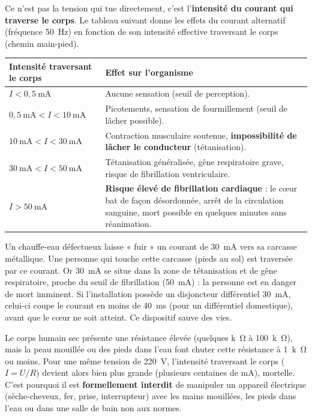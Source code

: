 \documentclass[11pt]{article}
\newcounter{popsec}
\newcounter{popsub}
\newcommand{\courssub}[1]{%
  \stepcounter{popsub}%
  \par\vspace{9pt}\noindent{\popxbold\fontsize{11.5}{13}\selectfont\color{popink}{\color{poporange}\thepopsec.\thepopsub}\hspace{6pt}#1}\par\nopagebreak\vspace{4pt}
}
\begin{document}
\courssub{Le danger du courant pour le corps humain}

Ce n'est pas la tension qui tue directement, c'est l'\textbf{intensité du courant qui traverse le corps}. Le tableau suivant donne les effets du courant alternatif (fréquence \SI{50}{Hz}) en fonction de son intensité effective traversant le corps (chemin main-pied).

\begin{center}
\begin{tabularx}{\linewidth}{|l|X|}
\hline
\rowcolor{popblueL} \textbf{Intensité traversant le corps} & \textbf{Effet sur l'organisme} \\
\hline
$I < 0{,}5\ \text{mA}$ & Aucune sensation (seuil de perception). \\
\hline
$0{,}5\ \text{mA} < I < 10\ \text{mA}$ & Picotements, sensation de fourmillement (seuil de lâcher possible). \\
\hline
$10\ \text{mA} < I < 30\ \text{mA}$ & Contraction musculaire soutenue, \textbf{impossibilité de lâcher le conducteur} (tétanisation). \\
\hline
$30\ \text{mA} < I < 50\ \text{mA}$ & Tétanisation généralisée, gêne respiratoire grave, risque de fibrillation ventriculaire. \\
\hline
$I > 50\ \text{mA}$ & \textbf{Risque élevé de fibrillation cardiaque} : le cœur bat de façon désordonnée, arrêt de la circulation sanguine, mort possible en quelques minutes sans réanimation. \\
\hline
\end{tabularx}
\end{center}

\begin{exemplebox}
Un chauffe-eau défectueux laisse « fuir » un courant de \SI{30}{mA} vers sa carcasse métallique. Une personne qui touche cette carcasse (pieds au sol) est traversée par ce courant. Or \SI{30}{mA} se situe dans la zone de tétanisation et de gêne respiratoire, proche du seuil de fibrillation (\SI{50}{mA}) : la personne est en danger de mort imminent. Si l'installation possède un disjoncteur différentiel \SI{30}{mA}, celui-ci coupe le courant en moins de \SI{40}{ms} (pour un différentiel domestique), avant que le cœur ne soit atteint. Ce dispositif sauve des vies.
\end{exemplebox}

\begin{attention}
Le corps humain sec présente une résistance élevée (quelques \si{k\ohm} à \SI{100}{k\ohm}), mais la peau mouillée ou des pieds dans l'eau font chuter cette résistance à \SI{1}{k\ohm} ou moins. Pour une même tension de \SI{220}{V}, l'intensité traversant le corps ($I = U/R$) devient alors bien plus grande (plusieurs centaines de mA), mortelle. C'est pourquoi il est \textbf{formellement interdit} de manipuler un appareil électrique (sèche-cheveux, fer, prise, interrupteur) avec les mains mouillées, les pieds dans l'eau ou dans une salle de bain non aux normes.
\end{attention}
\end{document}
